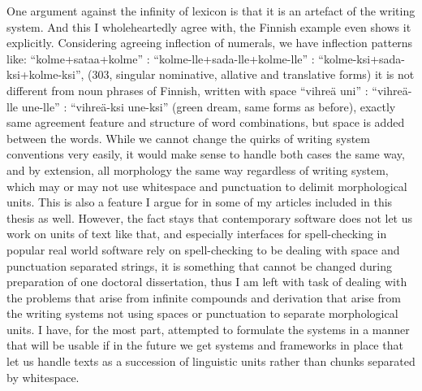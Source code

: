 \documentclass[officiallayout]{unihelcompling}
\begin{document}
One argument against the infinity of lexicon is that it is an artefact of the
writing system. And this I wholeheartedly agree with, the Finnish example even
shows it explicitly. Considering agreeing inflection of numerals, we have
inflection patterns like: ``kolme+sataa+kolme'' :
``kolme-lle+sada-lle+kolme-lle'' : ``kolme-ksi+sada-ksi+kolme-ksi'', (303,
singular nominative, allative and translative forms) it is not different from
noun phrases of Finnish, written with space ``vihreä uni'' : ``vihreä-lle
une-lle'' : ``vihreä-ksi une-ksi'' (green dream, same forms as before), exactly
same agreement feature and structure of word combinations, but space is added
between the words.  While we cannot change the quirks of writing system
conventions very easily, it would make sense to handle both cases the same way,
and by extension, all morphology the same way regardless of writing system,
which may or may not use whitespace and punctuation to delimit morphological
units.  This is also a feature I argue for in some of my articles included in
this thesis as well.  However, the fact stays that contemporary software does
not let us work on units of text like that, and especially interfaces for
spell-checking in popular real world software rely on spell-checking to be
dealing with space and punctuation separated strings, it is something that
cannot be changed during preparation of one doctoral dissertation, thus I am
left with task of dealing with the problems that arise from infinite compounds
and derivation that arise from the writing systems not using spaces or
punctuation to separate morphological units. I have, for the most part,
attempted to formulate the systems in a manner that will be usable if in the
future we get systems and frameworks in place that let us handle texts as a
succession of linguistic units rather than chunks separated by whitespace.
\end{document}
